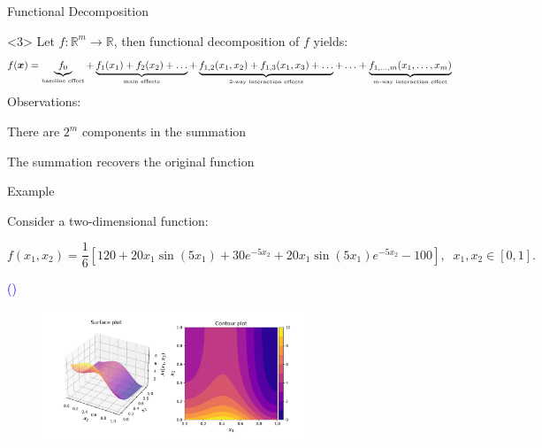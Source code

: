 \documentclass[english,aspectratio=169]{beamer}
\let\tempone\itemize
\let\temptwo\enditemize
\renewenvironment{itemize}{\tempone\addtolength{\itemsep}{0.35\baselineskip}}{\temptwo}
\begin{document}
\begin{frame}[fragile]{Functional Decomposition}
\begin{onlyenv}<3>
  \small
  Let $f: \mathbb{R}^m \rightarrow \mathbb{R}$, then functional decomposition of $f$ yields:
  \vspace{0.5em}
  \begin{equation*}
    f(\boldsymbol{x}) = \underbrace{f_0}_{\text{\tiny baseline effect}} + \underbrace{f_1(x_1) + f_2 (x_2) + \ldots}_{\text{\tiny main effects}} + \underbrace{f_{1, 2}(x_1, x_2) + f_{1, 3} (x_1, x_3) + \ldots}_{\text{\tiny $2$-way interaction effects}} + \ldots + \underbrace{f_{1, \ldots, m} (x_1, \ldots, x_m)}_{\text{\tiny $m$-way interaction effect}}
  \end{equation*}
  \vspace{0.5em}
  Observations:
  \begin{itemize}
    \item There are $2^m$ components in the summation
    \item The summation recovers the original function
  \end{itemize}
\end{onlyenv}

\end{frame}

\begin{frame}[fragile]{Example}
\small

\vspace{-1.0em}

Consider a two-dimensional function:

\begin{equation*}
  f(x_1, x_2) = \frac{1}{6} \left[ 120 + 20 x_1 \sin{(5x_1) + 30 e^{-5 x_2} + 20 x_1 \sin{(5 x_1)} e^{-5 x_2} - 100 } \right],\;\; x_1, x_2 \in [0, 1].
\end{equation*}
{\hfill \raggedright \tiny \textcolor{blue}{(\cite{Lim2002})}}

\vspace{-0.5em}

\begin{figure}
  \centering
  \includegraphics[width=0.7\textwidth]{./figures/lim2d.png}
\end{figure}

\end{frame}
\end{document}
